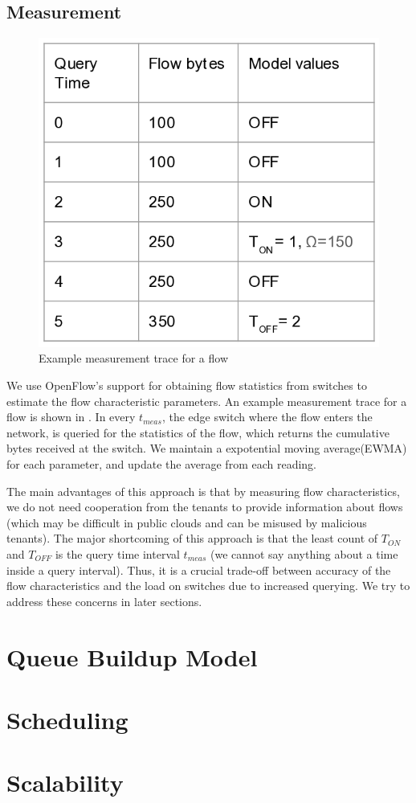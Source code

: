 \subsection{Measurement}
\begin{figure}[H]
	\centering
	\includegraphics[width=\columnwidth]{meastrace.png}
	\caption{Example measurement trace for a flow}
	\label{fig:meastrace}
\end{figure}
We use OpenFlow's support for obtaining flow statistics from 
switches to estimate the flow characteristic parameters. An example
measurement trace for a flow is shown in . In
every $t_{meas}$, the edge switch where the flow enters the network,
 is queried for the statistics of the 
flow, which returns the cumulative bytes received at the switch. We maintain
a expotential moving average(EWMA) for each parameter, and update the average
from each reading. 

The main advantages of this approach is that by measuring flow
characteristics, we do not need cooperation from the tenants to provide information about
flows (which may be difficult in public clouds and can be misused by malicious tenants). The 
major shortcoming of this approach is that the least count of $T_{ON}$ and $T_{OFF}$ is
the query time interval $t_{meas}$ (we cannot say anything about a time inside a query interval).
Thus, it is a crucial trade-off between accuracy of the flow characteristics and the load on switches
due to increased querying. We try to address these concerns in later sections.

\section{Queue Buildup Model}

\section{Scheduling }

\section{Scalability}
